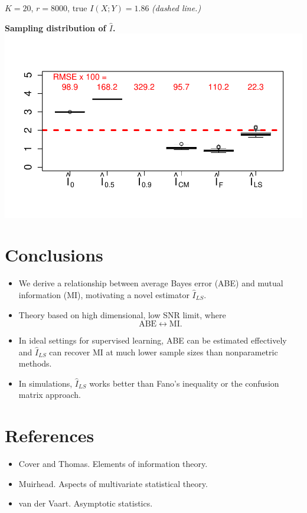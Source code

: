\documentclass[12pt]{article}
\begin{document}
$K=20$, $r = 8000$, true $I(X; Y) = 1.86$ \emph{(dashed line.)}

\begin{center}
\textbf{Sampling distribution of $\hat{I}$.}
\includegraphics[scale = 0.6, clip = true, trim = 0 0.5in 0 0.5in]{../info_theory_sims/fig6.pdf}
\end{center}

\section{Conclusions}

\begin{itemize}
\item We derive a relationship between average Bayes error (ABE) and mutual
  information (MI), motivating a novel estimator $\hat{I}_{LS}$.
\item Theory based on high dimensional, low SNR limit,
where \[\text{ABE} \leftrightarrow \text{MI}.\]
\item In ideal settings for supervised learning, ABE can be estimated
  effectively and $\hat{I}_{LS}$ can recover MI at much lower sample
  sizes than nonparametric methods.
\item In simulations, $\hat{I}_{LS}$ works better than Fano's
  inequality or the confusion matrix approach.
\end{itemize}

\section{References}
\begin{itemize}
\item Cover and Thomas.  Elements of information theory.
\item Muirhead.  Aspects of multivariate statistical theory.
\item van der Vaart.  Asymptotic statistics.
\end{itemize}
\end{document}

